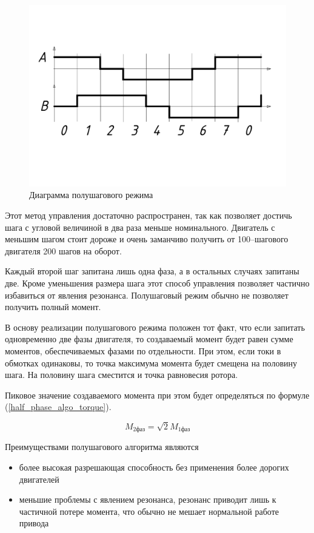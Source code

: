 \begin{figure}
    \centering
    \includegraphics[width=0.8\linewidth, keepaspectratio, trim=30mm 0mm 30mm 0mm]
                    {./src/pictures/control_algo/half_phase_algo_vector.pdf}
    \caption{Диаграмма полушагового режима}
    \label{pic_half_phase_algo}
\end{figure}

Этот метод управления достаточно распространен, так как позволяет достичь шага с
угловой величиной в два раза меньше номинального. Двигатель с меньшим шагом стоит
дороже и очень заманчиво получить от 100--шагового двигателя 200 шагов на оборот.

Каждый второй шаг запитана лишь одна фаза, а в остальных случаях запитаны две.
Кроме уменьшения размера шага этот способ управления позволяет частично избавиться
от явления резонанса. Полушаговый режим обычно не позволяет получить полный момент.

В основу реализации полушагового режима положен тот факт, что если запитать
одновременно две фазы двигателя, то создаваемый момент будет равен
сумме моментов, обеспечиваемых фазами по отдельности. При этом, если токи в
обмотках одинаковы, то точка максимума момента будет смещена на половину шага.
На половину шага сместится и точка равновесия ротора.

Пиковое значение создаваемого момента при этом будет определяться по формуле
(\ref{half_phase_algo_torque}).

\begin{equation}
    M_\textit{2фаз} = \sqrt{2} M_\textit{1фаз}
    \label{half_phase_algo_torque}
\end{equation}

Преимуществами полушагового алгоритма являются
\begin{itemize}
    \item более высокая разрешающая способность без применения более дорогих
        двигателей
    \item меньшие проблемы с явлением резонанса, резонанс приводит лишь к частичной
        потере момента, что обычно не мешает нормальной работе привода
\end{itemize}

